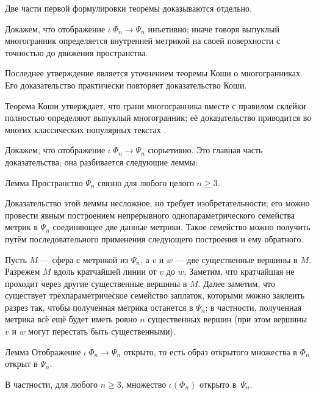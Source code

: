 \documentclass[oneside,a4paper]{article}
\begin{document}
\medskip

Две части первой формулировки теоремы доказываются отдельно.

 Докажем, что отображение $\iota\:\Phi_n\to\Psi_n$ инъетивно; иначе говоря выпуклый многогранник определяется внутренней метрикой на своей поверхности с точностью до движения пространства.

Последнее утверждение является уточнением теоремы Коши о многогранниках. 
Его доказательство практически повторяет доказательство Коши.

Теорема Коши утверждает, что грани многогранника вместе с правилом склейки полностью определяют выпуклый многогранник;
её доказательство приводится во многих классических популярных текстах \cite{aigner-zigler,dolbilin,tabacnikov-fuks}.

\medskip

 Докажем, что отображение $\iota\:\Phi_n\to\Psi_n$ сюрьетивно.
Это главная часть доказательства; она разбивается следующие леммы:

\begin{thm}{Лемма}
Пространство $\Psi_n$ связно для любого целого $n\ge 3$.
\end{thm}

Доказательство этой леммы несложное, но требует изобретательности; 
его можно провести явным построением непрерывного однопараметрического семейства  метрик в $\Psi_n$ соединяющее две данные метрики.
Такое семейство можно получить путём последовательного применения следующего построения и ему обратного.

Пусть $M$ --- сфера с метрикой из $\Psi_n$, а $v$ и $w$ --- две существенные вершины в $M$.
Разрежем $M$ вдоль кратчайшей линии от $v$ до $w$. 
Заметим, что кратчайшая не проходит через другие существенные вершины в $M$.
Далее заметим, что существует трёхпараметрическое семейство заплаток, которыми можно заклеить разрез так, чтобы полученная метрика останется в $\Psi_n$; 
в частности, полученная метрика всё ещё будет иметь ровно $n$ существенных вершин (при этом вершины $v$ и $w$ могут перестать быть существенными).


\begin{thm}{Лемма}
Отображение $\iota\:\Phi_n\to\Psi_n$ открыто, 
то есть образ открытого множества в $\Phi_n$ открыт в $\Psi_n$.

В частности, для любого $n\ge 3$, множество $\iota(\Phi_n)$ открыто в~$\Psi_n$.
\end{thm}
\end{document}
